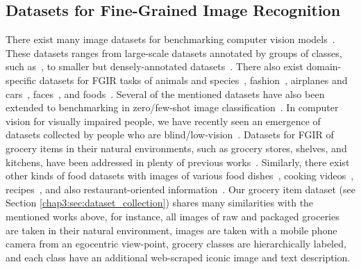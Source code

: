 \subsection{Datasets for Fine-Grained Image Recognition}

There exist many image datasets for benchmarking computer vision models~\cite{deng2009imagenet, nilsback2008automated, wah2011cub, krizhevsky2009learning, lin2014microsoft, van2018inaturalist, massiceti2021orbit, barbu2019objectnet}. These datasets ranges from large-scale datasets annotated by groups of classes, such as~\cite{deng2009imagenet, openimages}, to smaller but densely-annotated datasets~\cite{everingham2010pascal, lin2014microsoft, krishna2017visual, gupta2019lvis}. There also exist domain-specific datasets for FGIR tasks of animals and species~\cite{van2018inaturalist, van2021benchmarking, khosla2011stanforddogs, van2015building, parkhi12a, lampert2009learning}, fashion~\cite{liu2016deepfashion, jia2020fashionpedia}, airplanes and cars~\cite{vedaldi2014understanding, maji2013fine, krause20133d, yang2015large, gebru2017fine}, faces~\cite{parkhi2015deep, huang2008labeled, cao2018vggface2, guo2016ms}, and foods~\cite{hou2017vegfru, bossard2014food}. Several of the mentioned datasets have also been extended to benchmarking in zero/few-shot image classification~\cite{lampert2013attribute, reed2016learning, triantafillou2019meta, bujwid2021large}. In computer vision for visually impaired people, we have recently seen an emergence of datasets collected by people who are blind/low-vision~\cite{kacorri2017teachable, gurari2018vizwiz, sosa2017hands, massiceti2021orbit, gurari2019vizwiz}. Datasets for FGIR of grocery items in their natural environments, such as grocery stores, shelves, and kitchens, have been addressed in plenty of previous works~\cite{jund2016freiburg, waltner2015mango, george2014recognizing, merler2007recognizing, geng2018fine, wei2019rpc}. Similarly, there exist other kinds of food datasets with images of various food dishes~\cite{bossard2014food, kawano2014automatic, min2019ingredient, rich2016towards}, cooking videos~\cite{damen2018scaling, damen2021rescaling}, recipes~\cite{marin2019learning, salvador2017learning, yagcioglu2018recipeqa}, and also restaurant-oriented information~\cite{beijbom2015menu, xu2015geolocalized}. Our grocery item dataset (see Section \ref{chap3:sec:dataset_collection}) shares many similarities with the mentioned works above, for instance, all images of raw and packaged groceries are taken in their natural environment, images are taken with a mobile phone camera from an egocentric view-point, grocery classes are hierarchically labeled, and each class have an additional web-scraped iconic image and text description.



